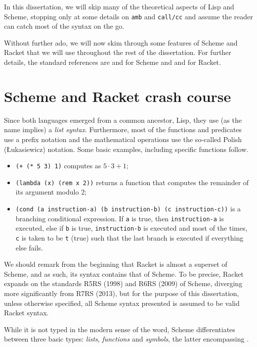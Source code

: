 In this dissertation, we will skip many of the theoretical aspects of Lisp
and Scheme, stopping only at some details on \texttt{amb} and \texttt{call/cc}
and assume the reader can catch most of the syntax on the go.

Without further ado, we will now skim through some features of Scheme and
Racket that we will use throughout the rest of the dissertation. For further
details, the standard references are \cite{sicp} and \cite{r7rs} for Scheme
and \cite{racket} and \cite{htdp} for Racket.

\section{Scheme and Racket crash course}

Since both languages emerged from a common ancestor, Lisp, they use (as the
name implies) a \emph{list syntax}. Furthermore, most of the functions
and predicates use a prefix notation and the mathematical operations
use the so-called Polish (\L{}ukasiewicz) notation. Some basic examples, including specific
functions follow.
\begin{itemize}
\item \texttt{(+ (* 5 3) 1)} computes as $ 5 \cdot 3 + 1 $;
\item \texttt{(lambda (x) (rem x 2))} returns a function that computes
  the remainder of its argument modulo 2;
\item \texttt{(cond (a instruction-a) (b instruction-b) (c instruction-c))} is a
  branching conditional expression. If \texttt{a} is true, then \texttt{instruction-a}
  is executed, else if \texttt{b} is true, \texttt{instruction-b} is executed and
  most of the times, \texttt{c} is taken to be \texttt{t} (true) such that the last
  branch is executed if everything else fails.
\end{itemize}

We should remark from the beginning that Racket is almost a superset of Scheme,
and as such, its syntax contains that of Scheme. To be precise, Racket expands
on the standards R5RS (1998) and R6RS (2009) of Scheme, diverging more
significantly from R7RS (2013), but for the purpose of this dissertation, unless
otherwise specified, all Scheme syntax presented is assumed to be valid Racket
syntax.

While it is not typed in the modern sense of the word, Scheme differentiates between
three basic types: \emph{lists}, \emph{functions} and \emph{symbols}, the latter
encompassing .

